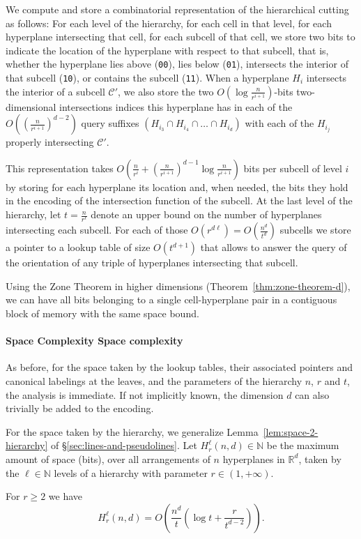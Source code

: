We compute and store a combinatorial representation of the hierarchical cutting
as follows: For each level of the hierarchy, for each cell in that level, for
each hyperplane intersecting that cell, for each subcell of that cell, we store
two bits to indicate the location of the hyperplane with respect to that
subcell\ifeurocg\else, that is, whether the hyperplane lies above
(\texttt{00}), lies below (\texttt{01}), intersects the interior of that
subcell (\texttt{10}), or contains the subcell (\texttt{11})\fi.
%
When a hyperplane \(H_{i}\) intersects the interior of a subcell \(\mathcal{C}'\),
we also store the two \(O(\log \frac{n}{r^{i+1}})\)-bits two-dimensional
intersections indices this hyperplane has in each of the
\(O\left({\left(\frac{n}{r^{i+1}}\right)}^{d-2}\right)\)
query suffixes \((H_{i_3} \cap H_{i_4} \cap \ldots \cap H_{i_d})\) with each of the
\(H_{i_j}\) properly intersecting \(\mathcal{C}'\).

This representation takes
\(O\left(
  \frac{n}{r^i}
  +
  {\left(\frac{n}{r^{i+1}}\right)}^{d-1} \log{\frac{n}{r^{i+1}}}
\right)\)
bits per subcell of level \(i\) by storing for each
hyperplane its location and, when needed, the bits they hold in
the encoding of the intersection function of the subcell.
At the last level of the hierarchy, let \(t =
\frac{n}{r^\ell}\) denote an upper bound on the number of hyperplanes
intersecting each subcell. For each of those \(O(r^{d \ell}) =
O(\frac{n^d}{t^d})\) subcells we store a pointer to a lookup table of size
\(O(t^{d+1})\) that allows to answer the query of the orientation of any
triple of hyperplanes intersecting that subcell.

Using the Zone Theorem in higher dimensions (Theorem~\ref{thm:zone-theorem-d}),
we can have all bits belonging to a single cell-hyperplane pair in a contiguous
block of memory with the same space bound.

\paragraph*{\iftitlecase%
Space Complexity\else%
Space complexity\fi}
As before, for the space taken by the lookup tables, their
associated pointers and canonical labelings at the leaves, and the parameters
of the hierarchy \(n\), \(r\) and \(t\), the analysis is immediate. If not
implicitly known, the dimension \(d\) can also trivially be added to the
encoding.

For the space taken by the hierarchy,
we generalize Lemma~\ref{lem:space-2-hierarchy} of
\S\ref{sec:lines-and-pseudolines}. Let \(H_r^\ell(n,d) \in \mathbb{N}\) be the maximum
amount of space (bits), over all arrangements of \(n\) hyperplanes in \(\mathbb{R}^d\),
taken by the \(\ell \in \mathbb{N}\) levels of a hierarchy with parameter \(r \in
(1,+\infty)\).
%
\begin{lemma}\label{lem:space-d-hierarchy}
For \( r \geq 2 \) we have
\begin{displaymath}
H_r^\ell(n,d)
=
O\left(\frac{n^d}{t} \left(\log t + \frac{r}{t^{d-2}}\right)\right).
\end{displaymath}
\end{lemma}

